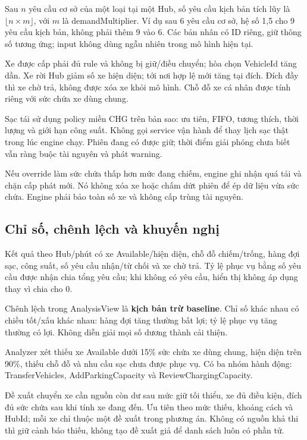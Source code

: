 \documentclass[12pt,a4paper]{article}
\begin{document}
Sau $n$ yêu cầu cơ sở của một loại tại một Hub, số yêu cầu kịch bản tích lũy là $\lfloor n\times m\rfloor$, với $m$ là demandMultiplier. Ví dụ sau 6 yêu cầu cơ sở, hệ số 1,5 cho 9 yêu cầu kịch bản, không phải thêm 9 vào 6. Các bản nhân có ID riêng, giữ thông số tương ứng; input không dùng ngẫu nhiên trong mô hình hiện tại.

Xe được cấp phải đủ rule và không bị giữ/điều chuyển; hòa chọn VehicleId tăng dần. Xe rời Hub giảm số xe hiện diện; tới nơi hợp lệ mới tăng tại đích. Đích đầy thì xe chờ trả, không được xóa xe khỏi mô hình. Chỗ đỗ xe cá nhân được tính riêng với sức chứa xe dùng chung.

Sạc tái sử dụng policy miền CHG trên bản sao: ưu tiên, FIFO, tương thích, thời lượng và giới hạn công suất. Không gọi service vận hành để thay lịch sạc thật trong lúc engine chạy. Phiên đang có được giữ; thời điểm giải phóng chưa biết vẫn ràng buộc tài nguyên và phát warning.

Nếu override làm sức chứa thấp hơn mức đang chiếm, engine ghi nhận quá tải và chặn cấp phát mới. Nó không xóa xe hoặc chấm dứt phiên để ép dữ liệu vừa sức chứa. Engine phải bảo toàn số xe và không cấp trùng tài nguyên.

\subsection{Chỉ số, chênh lệch và khuyến nghị}
Kết quả theo Hub/phút có xe Available/hiện diện, chỗ đỗ chiếm/trống, hàng đợi sạc, công suất, số yêu cầu nhận/từ chối và xe chờ trả. Tỷ lệ phục vụ bằng số yêu cầu được nhận chia tổng yêu cầu; khi không có yêu cầu, hiển thị không áp dụng thay vì chia cho 0.

Chênh lệch trong AnalysisView là \textbf{kịch bản trừ baseline}. Chỉ số khác nhau có chiều tốt/xấu khác nhau: hàng đợi tăng thường bất lợi; tỷ lệ phục vụ tăng thường có lợi. Không diễn giải mọi số dương thành cải thiện.

Analyzer xét thiếu xe Available dưới 15\% sức chứa xe dùng chung, hiện diện trên 90\%, thiếu chỗ đỗ và nhu cầu sạc chưa được phục vụ. Có ba nhóm hành động: TransferVehicles, AddParkingCapacity và ReviewChargingCapacity.

Đề xuất chuyển xe cần nguồn còn dư sau mức giữ tối thiểu, xe đủ điều kiện, đích đủ sức chứa sau khi tính xe đang đến. Ưu tiên theo mức thiếu, khoảng cách và HubId; mỗi xe chỉ thuộc một đề xuất trong phương án. Không có nguồn khả thi thì giữ cảnh báo thiếu, không tạo đề xuất giả để danh sách luôn có phần tử.
\end{document}
